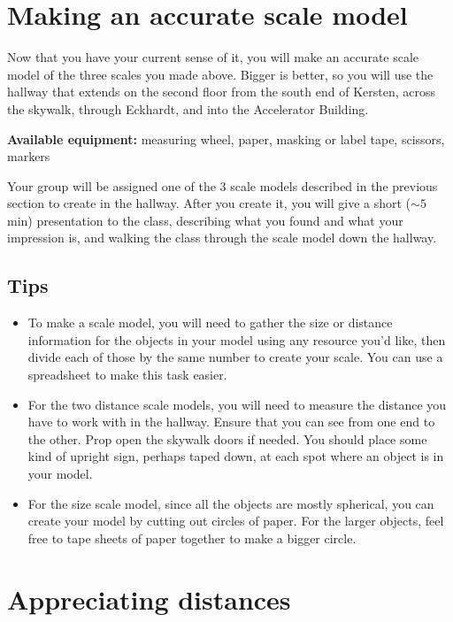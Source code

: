 \section{Making an accurate scale model}\label{se:sec:model}

Now that you have your current sense of it, you will make an accurate scale model of the three scales you made above. Bigger is better, so you will use the hallway that extends on the second floor from the south end of Kersten, across the skywalk, through Eckhardt, and into the Accelerator Building.

\textbf{Available equipment:} measuring wheel, paper, masking or label tape, scissors, markers

Your group will be assigned one of the 3 scale models described in the previous section to create in the hallway. After you create it, you will give a short ($\sim 5\:$min) presentation to the class, describing what you found and what your impression is, and walking the class through the scale model down the hallway.

\subsection{Tips}
\begin{itemize}
	\item To make a scale model, you will need to gather the size or distance information for the objects in your model using any resource you'd like, then divide each of those by the same number to create your scale. You can use a spreadsheet to make this task easier.
	
	\item For the two distance scale models, you will need to measure the distance you have to work with in the hallway. Ensure that you can see from one end to the other. Prop open the skywalk doors if needed. You should place some kind of upright sign, perhaps taped down, at each spot where an object is in your model.
	
	\item For the size scale model, since all the objects are mostly spherical, you can create your model by cutting out circles of paper. For the larger objects, feel free to tape sheets of paper together to make a bigger circle.
\end{itemize}

\section{Appreciating distances}\label{se:sec:calc}

